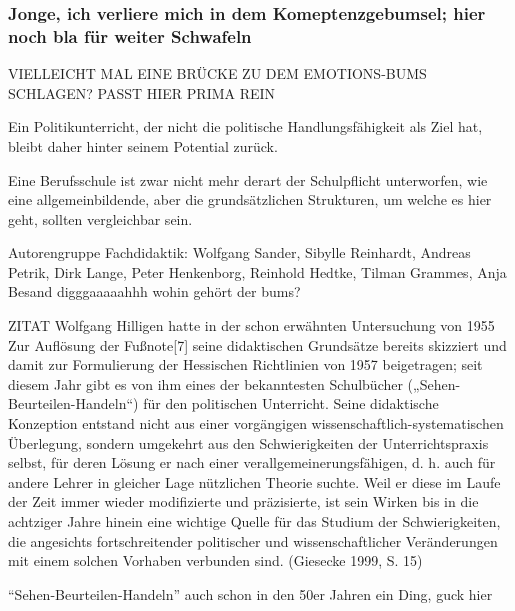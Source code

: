 \subsubsection{Jonge, ich verliere mich in dem Komeptenzgebumsel; hier noch bla für weiter Schwafeln}
VIELLEICHT MAL EINE BRÜCKE ZU DEM EMOTIONS-BUMS SCHLAGEN? PASST HIER PRIMA REIN



Ein Politikunterricht, der nicht die politische Handlungsfähigkeit als Ziel hat, bleibt daher hinter seinem Potential zurück.



Eine Berufsschule ist zwar nicht mehr derart der Schulpflicht unterworfen, wie eine allgemeinbildende, aber die grundsätzlichen Strukturen, um welche es hier geht, sollten vergleichbar sein.

 \textcite[467-469]{Nonnenmacher2010}

Autorengruppe Fachdidaktik:
Wolfgang Sander, Sibylle Reinhardt, Andreas Petrik, Dirk Lange, Peter Henkenborg, Reinhold Hedtke, Tilman Grammes, Anja Besand
\autocite[]{Sander.2016}
digggaaaaahhh wohin gehört der bums?\autocite[]{Sander.2016}

ZITAT
Wolfgang Hilligen hatte in der schon erwähnten Untersuchung von 1955 Zur Auflösung der Fußnote[7] seine didaktischen Grundsätze bereits skizziert und damit zur Formulierung der Hessischen Richtlinien von 1957 beigetragen; seit diesem Jahr gibt es von ihm eines der bekanntesten Schulbücher („Sehen-Beurteilen-Handeln“) für den politischen Unterricht. Seine didaktische Konzeption entstand nicht aus einer vorgängigen wissenschaftlich-systematischen Überlegung, sondern umgekehrt aus den Schwierigkeiten der Unterrichtspraxis selbst, für deren Lösung er nach einer verallgemeinerungsfähigen, d. h. auch für andere Lehrer in gleicher Lage nützlichen Theorie suchte. Weil er diese im Laufe der Zeit immer wieder modifizierte und präzisierte, ist sein Wirken bis in die achtziger Jahre hinein eine wichtige Quelle für das Studium der Schwierigkeiten, die angesichts fortschreitender politischer und wissenschaftlicher Veränderungen mit einem solchen Vorhaben verbunden sind.  (Giesecke 1999, S. 15)

\enquote{Sehen-Beurteilen-Handeln} auch schon in den 50er Jahren ein Ding, guck hier \autocite[15]{Giesecke.1999}


